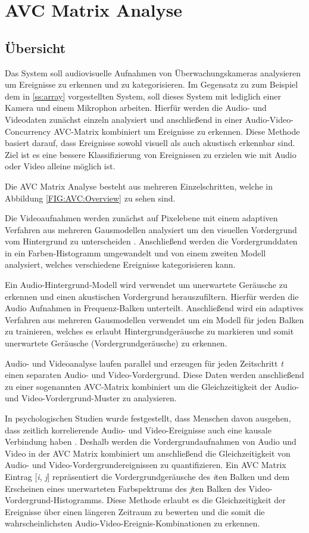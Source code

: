 \section{AVC Matrix Analyse}
\subsection{Übersicht}

Das System soll audiovisuelle Aufnahmen von Überwachungskameras analysieren um Ereignisse zu erkennen und zu kategorisieren. Im Gegensatz zu zum Beispiel dem in \ref{ss:array} vorgestellten System, soll dieses System mit lediglich einer Kamera und einem Mikrophon arbeiten. Hierfür werden die Audio- und Videodaten zunächst einzeln analysiert und anschließend in einer Audio-Video-Concurrency AVC-Matrix kombiniert um Ereignisse zu erkennen. Diese Methode basiert darauf, dass Ereignisse sowohl visuell als auch akustisch erkennbar sind. Ziel ist es eine bessere Klassifizierung von Ereignissen zu erzielen wie mit Audio oder Video alleine möglich ist.

Die AVC Matrix Analyse besteht aus mehreren Einzelschritten, welche in Abbildung \ref{FIG:AVC:Overview} zu sehen sind.  

Die Videoaufnahmen werden zunächst auf Pixelebene mit einem adaptiven Verfahren aus mehreren Gausmodellen analysiert um den visuellen Vordergrund vom Hintergrund zu unterscheiden \cite{CSEG:Tracking}. Anschließend werden die Vordergrunddaten in ein Farben-Histogramm umgewandelt und von einem zweiten Modell analysiert, welches verschiedene Ereignisse kategorisieren kann.  

Ein Audio-Hintergrund-Modell wird verwendet um unerwartete Geräusche zu erkennen und einen akustischen Vordergrund herauszufiltern. Hierfür werden die Audio Aufnahmen in Frequenz-Balken unterteilt. Anschließend wird ein adaptives Verfahren aus mehreren Gausmodellen verwendet um ein Modell für jeden Balken zu trainieren, welches es erlaubt Hintergrundgeräusche zu markieren und somit unerwartete Geräusche (Vordergrundgeräusche) zu erkennen.  

Audio- und Videoanalyse laufen parallel und erzeugen für jeden Zeitschritt \textit{t} einen separaten Audio- und Video-Vordergrund. Diese Daten werden anschließend zu einer sogenannten AVC-Matrix kombiniert um die Gleichzeitigkeit der Audio- und Video-Vordergrund-Muster zu analysieren.  

In psychologischen Studien wurde festgestellt, dass Menschen davon ausgehen, dass zeitlich korrelierende Audio- und Video-Ereignisse auch eine kausale Verbindung haben \cite{NHJ:Synchrony}. Deshalb werden die Vordergrundaufnahmen von Audio und Video in der AVC Matrix kombiniert um anschließend die Gleichzeitigkeit von Audio- und Video-Vordergrundereignissen zu quantifizieren. Ein AVC Matrix Eintrag [\textit{i}, \textit{j}] repräsentiert die Vordergrundgeräusche des \textit{i}ten Balken und dem Erscheinen eines unerwarteten Farbspektrums des \textit{j}ten Balken des Video-Vordergrund-Histogramms. Diese Methode erlaubt es die Gleichzeitigkeit der Ereignisse über einen längeren Zeitraum zu bewerten und die somit die wahrscheinlichsten Audio-Video-Ereignis-Kombinationen zu erkennen. 

